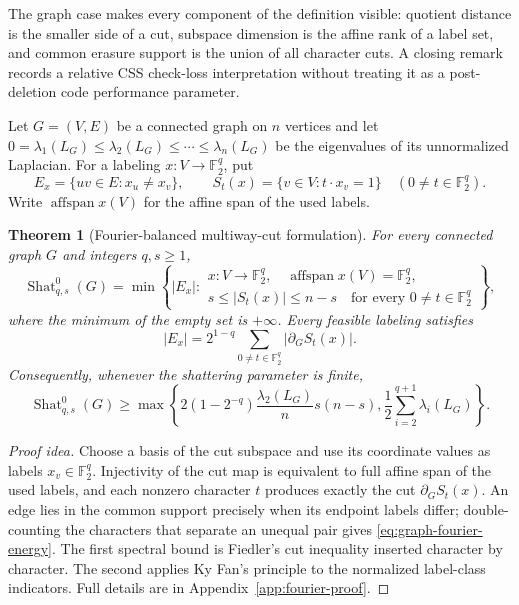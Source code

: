 \documentclass[11pt,letterpaper]{article}
\theoremstyle{plain}
\newtheorem{theorem}{Theorem}[section]
\theoremstyle{definition}
\newcommand{\F}{\mathbb{F}_2}
\newcommand{\Shat}{\operatorname{Shat}}
\newcommand{\1}{\mathbf{1}}
\newcommand{\abs}[1]{\left|#1\right|}
\begin{document}
The graph case makes every component of the definition visible: quotient distance is
the smaller side of a cut, subspace dimension is the affine rank of a label set, and
common erasure support is the union of all character cuts.  A closing remark records a
relative CSS check-loss interpretation without treating it as a post-deletion code
performance parameter.

Let $G=(V,E)$ be a connected graph on $n$ vertices and let
$0=\lambda_1(L_G)\le\lambda_2(L_G)\le\cdots\le\lambda_n(L_G)$ be the eigenvalues of
its unnormalized Laplacian.  For a labeling $x:V\to\F^q$, put
\[
 E_x=\{uv\in E:x_u\ne x_v\},
 \qquad
 S_t(x)=\{v\in V:t\cdot x_v=1\}
 \quad(0\ne t\in\F^q).
\]
Write $\operatorname{affspan}x(V)$ for the affine span of the used labels.

\begin{theorem}[Fourier-balanced multiway-cut formulation]
\label{thm:fourier-balanced-cut}
For every connected graph $G$ and integers $q,s\ge1$,
\begin{equation}\label{eq:graph-labeling-formulation}
 \Shat_{q,s}^0(G)=
 \min\left\{\abs{E_x}:\begin{array}{l}
 x:V\to\F^q,\quad \operatorname{affspan}x(V)=\F^q,\\
 s\le\abs{S_t(x)}\le n-s\quad\text{for every }0\ne t\in\F^q
 \end{array}\right\},
\end{equation}
where the minimum of the empty set is $+\infty$.  Every feasible labeling satisfies
\begin{equation}\label{eq:graph-fourier-energy}
 \abs{E_x}=2^{1-q}\sum_{0\ne t\in\F^q}\abs{\partial_G S_t(x)}.
\end{equation}
Consequently, whenever the shattering parameter is finite,
\begin{equation}\label{eq:graph-spectral-bounds}
 \Shat_{q,s}^0(G)\ge
 \max\left\{
 2(1-2^{-q})\frac{\lambda_2(L_G)}{n}s(n-s),
 \frac12\sum_{i=2}^{q+1}\lambda_i(L_G)
 \right\}.
\end{equation}
\end{theorem}

\begin{proof}[Proof idea]
Choose a basis of the cut subspace and use its coordinate values as labels
$x_v\in\F^q$.  Injectivity of the cut map is equivalent to full affine span of the used
labels, and each nonzero character $t$ produces exactly the cut
$\partial_G S_t(x)$.  An edge lies in the common support precisely when its endpoint
labels differ; double-counting the characters that separate an unequal pair gives
\eqref{eq:graph-fourier-energy}.  The first spectral bound is Fiedler's cut inequality
inserted character by character.  The second applies Ky Fan's principle to the
normalized label-class indicators.  Full details are in
Appendix~\ref{app:fourier-proof}.
\end{proof}
\end{document}
